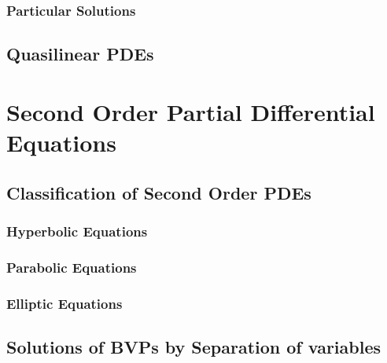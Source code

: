 \documentclass{article}
\theoremstyle{plain}
\theoremstyle{definition}
\numberwithin{equation}{section}
\begin{document}
\subsubsection{Particular Solutions}

\subsection{Quasilinear PDEs}

\section{Second Order Partial Differential Equations}

\subsection{Classification of Second Order PDEs}

\subsubsection{Hyperbolic Equations}

\subsubsection{Parabolic Equations}

\subsubsection{Elliptic Equations}

\subsection{Solutions of BVPs by Separation of variables}
\end{document}
